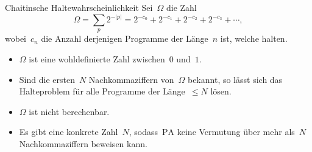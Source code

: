 \documentclass[12pt,compress,ngerman,utf8,t]{beamer}
\renewcommand{\_}{\mathpunct{.}\,}
\newcommand{\PA}{\mathrm{PA}}
\begin{document}

\begin{frame}{Chaitinsche Haltewahrscheinlichkeit}
  Sei~$\Omega$ die Zahl
  \[ \Omega = \sum_p 2^{-|p|} = 2^{-c_0} + 2^{-c_1} + 2^{-c_2} + 2^{-c_3} + \cdots\!, \]
  wobei~$c_n$ die Anzahl derjenigen Programme der Länge~$n$ ist, welche halten.

  \begin{itemize}
    \item $\Omega$ ist eine wohldefinierte Zahl zwischen~$0$ und~$1$.
    \item Sind die ersten~$N$ Nachkommaziffern von~$\Omega$ bekannt,
    so lässt sich das Halteproblem für alle Programme der Länge~$\leq N$ lösen.
    \pause
    \item $\Omega$ ist nicht berechenbar.
    \pause
    \item Es gibt eine konkrete Zahl~$N$, sodass~$\PA$ keine Vermutung über
    mehr als~$N$ Nachkommaziffern beweisen kann.
  \end{itemize}
\end{frame}
\end{document}
